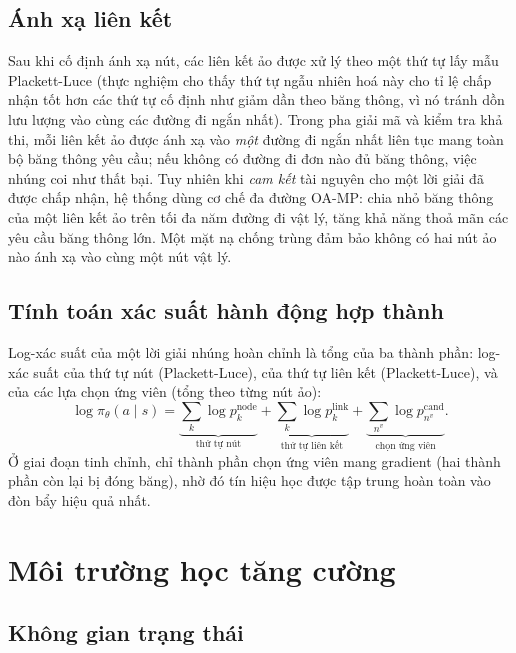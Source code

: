 \documentclass[../DoAn.tex]{subfiles}
\begin{document}
\subsection{Ánh xạ liên kết}
\label{subsec:cand-link}

Sau khi cố định ánh xạ nút, các liên kết ảo được xử lý theo một thứ tự lấy mẫu Plackett-Luce (thực nghiệm cho thấy thứ tự ngẫu nhiên hoá này cho tỉ lệ chấp nhận tốt hơn các thứ tự cố định như giảm dần theo băng thông, vì nó tránh dồn lưu lượng vào cùng các đường đi ngắn nhất). Trong pha giải mã và kiểm tra khả thi, mỗi liên kết ảo được ánh xạ vào \textit{một} đường đi ngắn nhất liên tục mang toàn bộ băng thông yêu cầu; nếu không có đường đi đơn nào đủ băng thông, việc nhúng coi như thất bại. Tuy nhiên khi \textit{cam kết} tài nguyên cho một lời giải đã được chấp nhận, hệ thống dùng cơ chế đa đường OA-MP: chia nhỏ băng thông của một liên kết ảo trên tối đa năm đường đi vật lý, tăng khả năng thoả mãn các yêu cầu băng thông lớn. Một mặt nạ chống trùng đảm bảo không có hai nút ảo nào ánh xạ vào cùng một nút vật lý.

\subsection{Tính toán xác suất hành động hợp thành}
\label{subsec:cand-logprob}

Log-xác suất của một lời giải nhúng hoàn chỉnh là tổng của ba thành phần: log-xác suất của thứ tự nút (Plackett-Luce), của thứ tự liên kết (Plackett-Luce), và của các lựa chọn ứng viên (tổng theo từng nút ảo):
\begin{equation}
    \log \pi_\theta(a \mid s) = \underbrace{\sum_{k} \log p^{\text{node}}_k}_{\text{thứ tự nút}} + \underbrace{\sum_{k} \log p^{\text{link}}_k}_{\text{thứ tự liên kết}} + \underbrace{\sum_{n^v} \log p^{\text{cand}}_{n^v}}_{\text{chọn ứng viên}}.
    \label{eq:logprob}
\end{equation}
Ở giai đoạn tinh chỉnh, chỉ thành phần chọn ứng viên mang gradient (hai thành phần còn lại bị đóng băng), nhờ đó tín hiệu học được tập trung hoàn toàn vào đòn bẩy hiệu quả nhất.

\section{Môi trường học tăng cường}            %
\label{sec:env}

\subsection{Không gian trạng thái}
\label{subsec:env-state}
\end{document}
